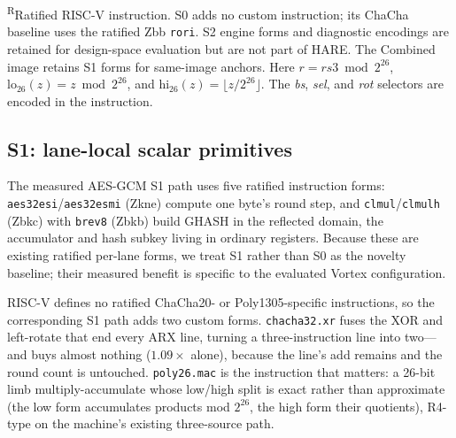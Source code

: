 \documentclass[conference]{IEEEtran}
\begin{document}
\begin{table}[t]
\parbox{\textwidth}{\scriptsize
\textsuperscript{R}Ratified RISC-V instruction. S0 adds no custom instruction;
its ChaCha baseline uses the ratified Zbb \texttt{rori}. S2 engine forms and
diagnostic encodings are retained for design-space evaluation but are not part
of HARE. The Combined image retains S1 forms for same-image anchors. Here
$r=rs3\bmod 2^{26}$,
$\mathrm{lo}_{26}(z)=z\bmod 2^{26}$, and
$\mathrm{hi}_{26}(z)=\lfloor z/2^{26}\rfloor$.
The \emph{bs}, \emph{sel}, and \emph{rot}
selectors are encoded in the instruction.}
\end{table}

\subsection{S1: lane-local scalar primitives}
The measured AES-GCM S1 path uses five ratified instruction forms:
\texttt{aes32esi}/\texttt{aes32esmi} (Zkne) compute one byte's
round step, and \texttt{clmul}/\texttt{clmulh} (Zbkc) with \texttt{brev8}
(Zbkb) build GHASH in the reflected domain, the accumulator and hash subkey
living in ordinary registers. Because these are existing ratified per-lane
forms, we treat S1 rather than S0 as the novelty baseline; their measured
benefit is specific to the evaluated Vortex configuration.

RISC-V defines no ratified ChaCha20- or Poly1305-specific instructions, so the
corresponding S1 path adds two custom forms. \texttt{chacha32.xr} fuses the XOR and left-rotate that end
every ARX line, turning a three-instruction line into two---and buys almost
nothing ($1.09\times$ alone), because the line's add remains and the round
count is untouched. \texttt{poly26.mac} is the instruction that matters: a
26-bit limb multiply-accumulate whose low/high split is exact rather than
approximate (the low form accumulates products mod $2^{26}$, the high form
their quotients), R4-type on the machine's existing three-source path.
\end{document}

